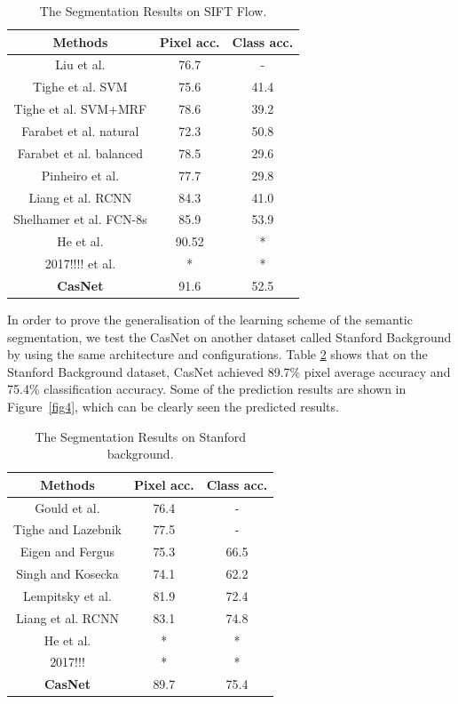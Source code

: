 \documentclass[10.5pt,compsoc]{TsT}
\newcommand{\upcite}[1]{\superscript{\textsuperscript{\cite{#1}}}}
\theoremstyle{mystyle}
\newcommand{\upcite}[1]{\textsuperscript{\cite{#1}}}
\begin{document}
\begin{table}[h]
\large
\setlength{\belowcaptionskip}{12pt}
\caption{The Segmentation Results on SIFT Flow.}
\label{table1}
\centering
\begin{tabular}{ccc}
\hline 
Methods & Pixel acc. & Class acc. \\
\hline
Liu et al.\upcite{6} & 76.7 & - \\
Tighe et al. SVM\upcite{25} & 75.6 & 41.4 \\
Tighe et al. SVM+MRF\upcite{26} & 78.6 & 39.2 \\
Farabet et al. natural\upcite{11} & 72.3 & 50.8 \\
Farabet et al. balanced\upcite{11} & 78.5 & 29.6 \\
Pinheiro et al.\upcite{13} & 77.7 & 29.8 \\
Liang et al. RCNN\upcite{24} & 84.3 & 41.0 \\
Shelhamer et al. FCN-8s\upcite{4} & 85.9 & 53.9 \\
He et al. \upcite{1} & 90.52  & * \\
2017!!!! et al. \upcite{*} & * & * \\
\textbf{CasNet} & 91.6 & 52.5 \\

\hline
\end{tabular}
\end{table}

In order to prove the generalisation of the learning scheme of the semantic segmentation, we test the CasNet on another dataset called Stanford Background by using the same architecture and configurations. Table \ref{table2} shows that on the Stanford Background dataset, CasNet achieved 89.7\% pixel average accuracy and 75.4\% classification accuracy. Some of the prediction results are shown in Figure~\ref{fig4}, which can be clearly seen the predicted results.

\begin{table}[h]
\large
\setlength{\belowcaptionskip}{12pt}
\caption{The Segmentation Results on Stanford background.}
\label{table2}
\centering
\begin{tabular}{ccc}
\hline 
Methods & Pixel acc. & Class acc. \\
\hline
Gould et al.\upcite{7} & 76.4 & - \\
Tighe and Lazebnik\upcite{25} & 77.5 & - \\
Eigen and Fergus\upcite{28} & 75.3 & 66.5 \\
Singh and Kosecka\upcite{27} & 74.1 & 62.2 \\
Lempitsky et al.\upcite{10} & 81.9 & 72.4 \\
Liang et al. RCNN\upcite{24} & 83.1 & 74.8 \\
He et al. \upcite{1} & * & * \\
2017!!!\upcite{*} & * & * \\
\textbf{CasNet} & 89.7 & 75.4 \\
\hline
\end{tabular}
\end{table}
\end{document}
